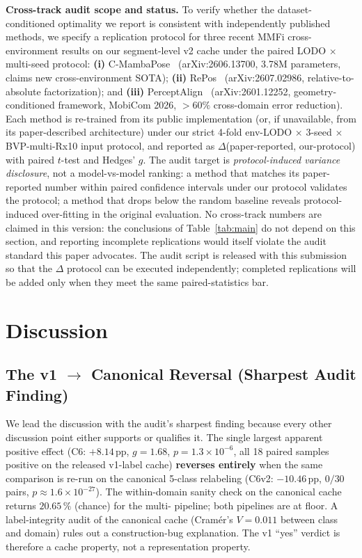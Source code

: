 \documentclass[11pt]{article}
\theoremstyle{definition}
\newcommand{\Rx}{\text{Rx}}
\begin{document}
\textbf{Cross-track audit scope and status.} To verify whether the dataset-conditioned optimality we report is consistent with independently published methods, we specify a replication protocol for three recent MMFi cross-environment results on our segment-level v2 cache under the paired LODO $\times$ multi-seed protocol: \textbf{(i)} C-MambaPose~\cite{phuc2026cmambapose} (arXiv:2606.13700, 3.78M parameters, claims new cross-environment SOTA); \textbf{(ii)} RePos~\cite{hou2026repos} (arXiv:2607.02986, relative-to-absolute factorization); and \textbf{(iii)} PerceptAlign~\cite{chen2026perceptalign} (arXiv:2601.12252, geometry-conditioned framework, MobiCom 2026, $>60\%$ cross-domain error reduction). Each method is re-trained from its public implementation (or, if unavailable, from its paper-described architecture) under our strict 4-fold env-LODO $\times$ 3-seed $\times$ BVP-multi-Rx10 input protocol, and reported as $\Delta$(paper-reported, our-protocol) with paired $t$-test and Hedges' $g$. The audit target is \emph{protocol-induced variance disclosure}, not a model-vs-model ranking: a method that matches its paper-reported number within paired confidence intervals under our protocol validates the protocol; a method that drops below the random baseline reveals protocol-induced over-fitting in the original evaluation. No cross-track numbers are claimed in this version: the conclusions of Table~\ref{tab:main} do not depend on this section, and reporting incomplete replications would itself violate the audit standard this paper advocates. The audit script is released with this submission so that the $\Delta$ protocol can be executed independently; completed replications will be added only when they meet the same paired-statistics bar.

\section{Discussion}
\label{sec:discussion}

\subsection{The v1 $\rightarrow$ Canonical Reversal (Sharpest Audit Finding)}
\label{sec:discussion-reversal}

We lead the discussion with the audit's sharpest finding because every other discussion point either supports or qualifies it. The single largest apparent positive effect (C6: $+8.14$\,pp, $g = 1.68$, $p = 1.3\times10^{-6}$, all 18 paired samples positive on the released v1-label cache) \textbf{reverses entirely} when the same comparison is re-run on the canonical 5-class relabeling (C6v2: $-10.46$\,pp, $0/30$ pairs, $p \approx 1.6\times10^{-27}$). The within-domain sanity check on the canonical cache returns $20.65\,\%$ (chance) for the multi-\Rx{} pipeline; both pipelines are at floor. A label-integrity audit of the canonical cache (Cram\'er's $V = 0.011$ between class and domain) rules out a construction-bug explanation. The v1 ``yes'' verdict is therefore a cache property, not a representation property.
\end{document}
